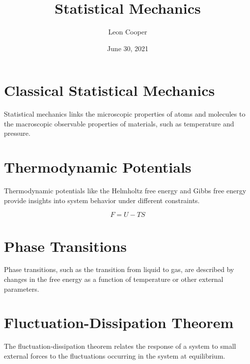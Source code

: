 \documentclass{article}
\title{Statistical Mechanics}
\author{Leon Cooper}
\date{June 30, 2021}
\begin{document}
\maketitle

\section{Classical Statistical Mechanics}
Statistical mechanics links the microscopic properties of atoms and molecules to the macroscopic observable properties of materials, such as temperature and pressure.

\section{Thermodynamic Potentials}
Thermodynamic potentials like the Helmholtz free energy and Gibbs free energy provide insights into system behavior under different constraints.

\begin{equation}
F = U - TS
\end{equation}

\section{Phase Transitions}
Phase transitions, such as the transition from liquid to gas, are described by changes in the free energy as a function of temperature or other external parameters.

\section{Fluctuation-Dissipation Theorem}
The fluctuation-dissipation theorem relates the response of a system to small external forces to the fluctuations occurring in the system at equilibrium.
\end{document}

